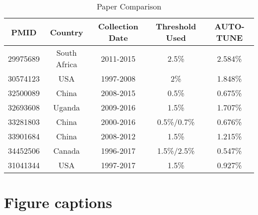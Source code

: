 \documentclass[utf8]{FrontiersinHarvard} %
\begin{document}
\begin{table}[h]
\caption{Paper Comparison}
\vspace{10pt}
\centering
\label{tab:paperComparison}
\begin{tabular}{|c|c|c|c|c|}
\hline
PMID & Country & Collection Date & Threshold Used & AUTO-TUNE \\
\hline
29975689 & South Africa & 2011-2015 & 2.5\% & 2.584\% \\
30574123 & USA & 1997-2008 & 2\% & 1.848\% \\
32500089 & China & 2008-2015 & 0.5\% & 0.675\% \\
32693608 & Uganda & 2009-2016 & 1.5\% & 1.707\% \\
33281803 & China & 2000-2016 & 0.5\%/0.7\% & 0.676\% \\
33901684 & China & 2008-2012 & 1.5\% & 1.215\% \\
34452506 & Canada & 1996-2017 & 1.5\%/2.5\% & 0.547\% \\
31041344 & USA & 1997-2017 & 1.5\% & 0.927\% \\
\hline
\end{tabular}
\end{table}

\section{Figure captions}
\end{document}
